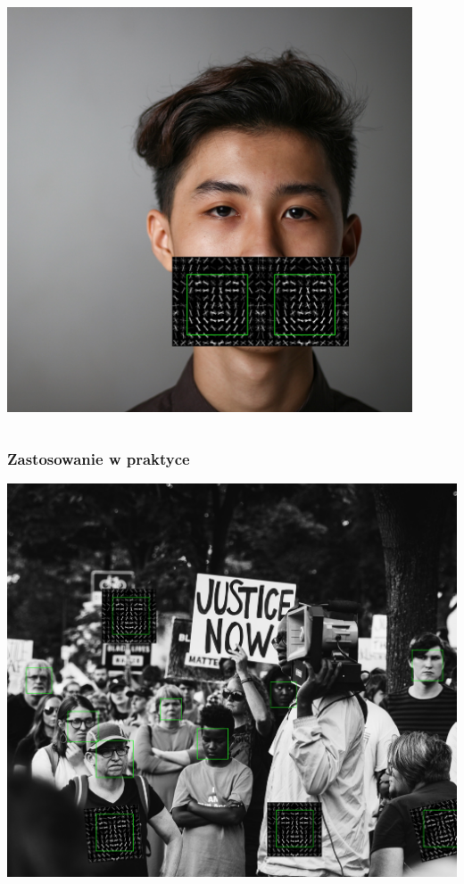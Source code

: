 \documentclass{beamer}
\begin{document}
\begin{frame}
\begin{columns}
\begin{column}{0.5\textwidth}
\begin{center}
                            \includegraphics[width=0.9\textwidth]{pictures/face_unsplash_two_hogs_detected}
                        \end{center}
                    \end{column}
                \end{columns}
            \end{frame}

            \begin{frame}
                \frametitle{Zastosowanie w praktyce}
                \begin{center}
                    \includegraphics[height=0.8\textheight]{pictures/protest_faces_hogs}
                \end{center}
            \end{frame}
\end{document}
